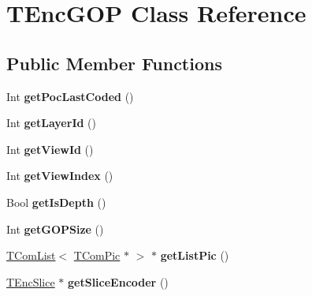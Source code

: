 \hypertarget{class_t_enc_g_o_p}{}\section{T\+Enc\+G\+OP Class Reference}
\label{class_t_enc_g_o_p}
\subsection*{Public Member Functions}
\begin{DoxyCompactItemize}
\item 
\mbox{\label{class_t_enc_g_o_p_a84d0dffac29d6551c45b9888e5b3d671}} 
Int {\bfseries get\+Poc\+Last\+Coded} ()
\item 
\mbox{\label{class_t_enc_g_o_p_ad57848419ad49769e23edbf46e846602}} 
Int {\bfseries get\+Layer\+Id} ()
\item 
\mbox{\label{class_t_enc_g_o_p_aca4bfbc47b97f026fe48a3c884479cbd}} 
Int {\bfseries get\+View\+Id} ()
\item 
\mbox{\label{class_t_enc_g_o_p_ac8f039dd5487dd5375518358c5a3f769}} 
Int {\bfseries get\+View\+Index} ()
\item 
\mbox{\label{class_t_enc_g_o_p_ad7504b80f93783c3118c1985a4585286}} 
Bool {\bfseries get\+Is\+Depth} ()
\item 
\mbox{\label{class_t_enc_g_o_p_a6a152ce70092c99a5868b40993c0dba5}} 
Int {\bfseries get\+G\+O\+P\+Size} ()
\item 
\mbox{\label{class_t_enc_g_o_p_aa6cda0074edbea783fc37cc27cc656cb}} 
\hyperlink{class_t_com_list}{T\+Com\+List}$<$ \hyperlink{class_t_com_pic}{T\+Com\+Pic} $\ast$ $>$ $\ast$ {\bfseries get\+List\+Pic} ()
\item 
\mbox{\label{class_t_enc_g_o_p_a81d96fa41edab4288db2896e1fd18393}} 
\hyperlink{class_t_enc_slice}{T\+Enc\+Slice} $\ast$ {\bfseries get\+Slice\+Encoder} ()
\end{DoxyCompactItemize}
